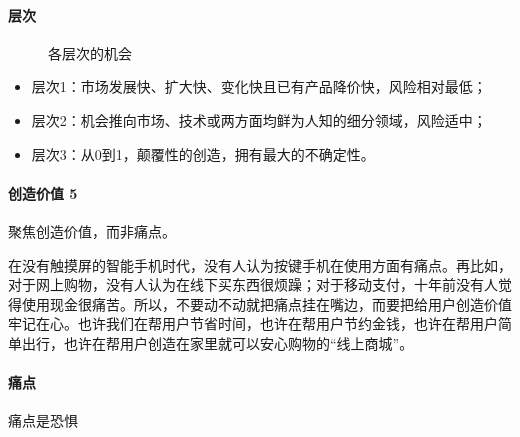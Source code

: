 \documentclass[letterpaper,11pt,english]{sphinxmanual}
\begin{document}
\paragraph{层次}
\label{\detokenize{chapter_introduction/opportunity:id2}}
\begin{figure}[H]
\centering
\capstart

\noindent{}
\caption{各层次的机会\sphinxfootnotemark[301]}\label{\detokenize{chapter_introduction/opportunity:id12}}\end{figure}
%
\begin{footnotetext}[301]\sphinxAtStartFootnote
{}
%
\end{footnotetext}\ignorespaces \begin{itemize}
\item {} 
层次1：市场发展快、扩大快、变化快且已有产品降价快，风险相对最低；

\item {} 
层次2：机会推向市场、技术或两方面均鲜为人知的细分领域，风险适中；

\item {} 
层次3：从0到1，颠覆性的创造，拥有最大的不确定性。

\end{itemize}


\paragraph{创造价值 5\sphinxfootnotemark[302]}
\label{\detokenize{chapter_introduction/opportunity:id3}}%
\begin{footnotetext}[302]\sphinxAtStartFootnote
{}
%
\end{footnotetext}\ignorespaces 
聚焦创造价值，而非痛点。

在没有触摸屏的智能手机时代，没有人认为按键手机在使用方面有痛点。再比如，对于网上购物，没有人认为在线下买东西很烦躁；对于移动支付，十年前没有人觉得使用现金很痛苦。所以，不要动不动就把痛点挂在嘴边，而要把给用户创造价值牢记在心。也许我们在帮用户节省时间，也许在帮用户节约金钱，也许在帮用户简单出行，也许在帮用户创造在家里就可以安心购物的“线上商城”。


\paragraph{痛点}
\label{\detokenize{chapter_introduction/opportunity:id4}}
痛点是恐惧
\end{document}
